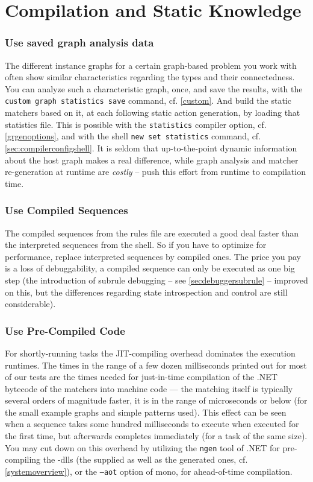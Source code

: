 \pagebreak

\section{Compilation and Static Knowledge}

\subsubsection*{Use saved graph analysis data}
The different instance graphs for a certain graph-based problem you work with often show similar characteristics regarding the types and their connectedness.
You can analyze such a characteristic graph, once, and save the results,
with the \texttt{custom graph statistics save} command, cf. \ref{custom}.
And build the static matchers based on it, at each following static action generation, by loading that statistics file. 
This is possible with the \texttt{statistics} compiler option, cf. \ref{grgenoptions},
and with the shell \texttt{new set statistics} command, cf. \ref{sec:compilerconfigshell}. 
It is seldom that up-to-the-point dynamic information about the host graph makes a real difference,
while graph analysis and matcher re-generation at runtime are \emph{costly} -- push this effort from runtime to compilation time.

\subsubsection*{Use Compiled Sequences}
The compiled sequences from the rules file are executed a good deal faster than the interpreted sequences from the shell.
So if you have to optimize for performance, replace interpreted sequences by compiled ones.
The price you pay is a loss of debuggability, a compiled sequence can only be executed as one big step 
(the introduction of subrule debugging -- see \ref{secdebuggersubrule} -- improved on this, but the differences regarding state introspection and control are still considerable).

\subsubsection*{Use Pre-Compiled Code}
For shortly-running tasks the JIT-compiling overhead dominates the execution runtimes.
The times in the range of a few dozen milliseconds printed out for most of our tests are the times needed for just-in-time compilation of the .NET bytecode of the matchers into machine code --- the matching itself is typically several orders of magnitude faster, it is in the range of microseconds or below (for the small example graphs and simple patterns used).
This effect can be seen when a sequence takes some hundred milliseconds to execute when executed for the first time, but afterwards completes immediately (for a task of the same size).
You may cut down on this overhead by utilizing the \texttt{ngen} tool of .NET for pre-compiling the \GrG-dlls (the supplied as well as the generated ones, cf. \ref{systemoverview}), or the \texttt{--aot} option of mono, for ahead-of-time compilation.


